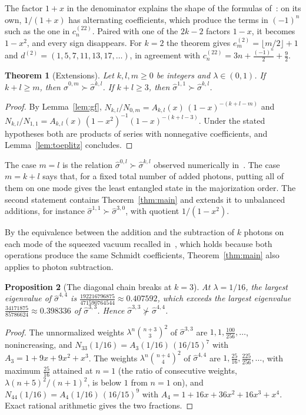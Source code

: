 \documentclass[11pt,a4paper]{article}
\newtheorem{theorem}{Theorem}
\newtheorem{proposition}[theorem]{Proposition}
\theoremstyle{definition}
\theoremstyle{plain}
\newcommand{\sig}[2]{\hat\sigma^{#1,#2}}
\begin{document}
The factor $1+x$ in the denominator explains the shape of the formulas
of~\cite{VanHerstraeten2024}: on its own, $1/(1+x)$ has alternating
coefficients, which produce the terms in $(-1)^n$ such as the one in
$c^{(22)}_n$. Paired with one of the $2k-2$ factors $1-x$, it becomes $1-x^2$,
and every sign disappears. For $k=2$ the theorem gives
$e^{(2)}_m=\lfloor m/2\rfloor+1$ and
$d^{(2)}=(1,5,7,11,13,17,\dots)$, in agreement with
$c^{(22)}_n=3n+\tfrac{(-1)^n}{2}+\tfrac92$.

\begin{theorem}[Extensions]\label{thm:ext}
Let $k,l,m\ge0$ be integers and $\lambda\in(0,1)$. If $k+l\ge m$, then
$\sig0m\succ\sig kl$. If $k+l\ge3$, then $\sig11\succ\sig kl$.
\end{theorem}

\begin{proof}
By Lemma~\ref{lem:gf},
$N_{k,l}/N_{0,m}=A_{k,l}(x)\,(1-x)^{-(k+l-m)}$ and
$N_{k,l}/N_{1,1}=A_{k,l}(x)\,(1-x^2)^{-1}(1-x)^{-(k+l-3)}$. Under the stated
hypotheses both are products of series with nonnegative coefficients, and
Lemma~\ref{lem:toeplitz} concludes.
\end{proof}

The case $m=l$ is the relation $\sig0l\succ\sig kl$ observed numerically
in~\cite{VanHerstraeten2024}. The case $m=k+l$ says that, for a fixed total
number of added photons, putting all of them on one mode gives the least
entangled state in the majorization order. The second statement contains
Theorem~\ref{thm:main} and extends it to unbalanced additions, for instance
$\sig11\succ\sig30$, with quotient $1/(1-x^2)$.

By the equivalence between the addition and the subtraction of $k$ photons on
each mode of the squeezed vacuum recalled in~\cite{VanHerstraeten2024}, which
holds because both operations produce the same Schmidt coefficients,
Theorem~\ref{thm:main} also applies to photon subtraction.

\begin{proposition}[The diagonal chain breaks at $k=3$]\label{prop:chain}
At $\lambda=1/16$, the largest eigenvalue of $\sig44$ is
$\tfrac{192216796875}{471590764544}\approx0.407592$, which exceeds the largest
eigenvalue $\tfrac{34171875}{85786624}\approx0.398336$ of $\sig33$. Hence
$\sig33\not\succ\sig44$.
\end{proposition}

\begin{proof}
The unnormalized weights $\lambda^n\binom{n+3}{3}^2$ of $\sig33$ are
$1,1,\tfrac{100}{256},\dots$, nonincreasing, and
$N_{33}(1/16)=A_3(1/16)\,(16/15)^7$ with $A_3=1+9x+9x^2+x^3$. The weights
$\lambda^n\binom{n+4}{4}^2$ of $\sig44$ are $1,\tfrac{25}{16},\tfrac{225}{256},\dots$,
with maximum $\tfrac{25}{16}$ attained at $n=1$ (the ratio of consecutive
weights, $\lambda(n+5)^2/(n+1)^2$, is below $1$ from $n=1$ on), and
$N_{44}(1/16)=A_4(1/16)\,(16/15)^9$ with $A_4=1+16x+36x^2+16x^3+x^4$. Exact
rational arithmetic gives the two fractions.
\end{proof}
\end{document}
